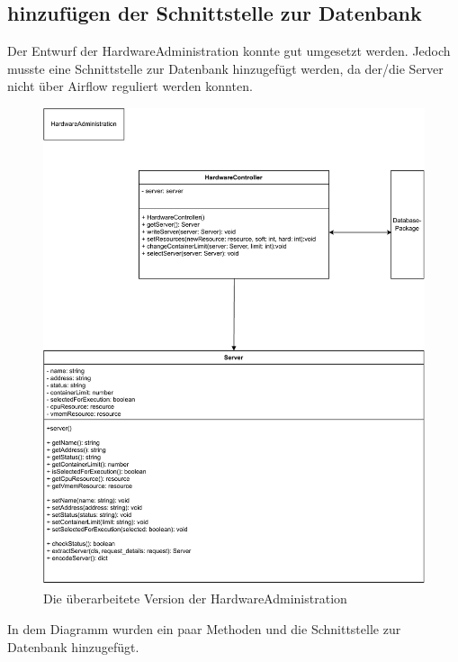 \subsection{hinzufügen der Schnittstelle zur Datenbank}
Der Entwurf der HardwareAdministration konnte gut umgesetzt werden. Jedoch musste eine Schnittstelle zur Datenbank hinzugefügt werden, da der/die Server nicht über Airflow reguliert
werden konnten.

\begin{figure}[h]
            \label{HardwareAdministration}
            \centerline{\includegraphics[scale=0.7]{res/HardwareAdministration.pdf}}
            \caption{Die überarbeitete Version der HardwareAdministration}
\end{figure}

In dem Diagramm wurden ein paar Methoden und die Schnittstelle zur Datenbank hinzugefügt.